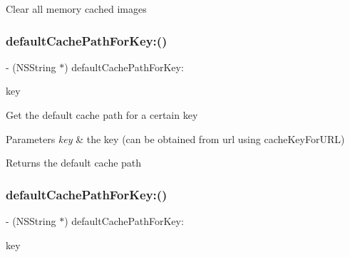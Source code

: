 Clear all memory cached images \mbox{\label{interface_s_d_image_cache_a591ff2cb8bcd813969b33c610c569bdc}} 
\subsubsection{\texorpdfstring{default\+Cache\+Path\+For\+Key\+:()}{defaultCachePathForKey:()}\hspace{0.1cm}{\footnotesize\ttfamily [1/3]}}
{\footnotesize\ttfamily -\/ (N\+S\+String $\ast$) default\+Cache\+Path\+For\+Key\+: \begin{DoxyParamCaption}\item[{(N\+S\+String $\ast$)}]{key }\end{DoxyParamCaption}}

Get the default cache path for a certain key


\begin{DoxyParams}{Parameters}
{\em key} & the key (can be obtained from url using cache\+Key\+For\+U\+RL)\\
\hline
\end{DoxyParams}
\begin{DoxyReturn}{Returns}
the default cache path 
\end{DoxyReturn}
\mbox{\label{interface_s_d_image_cache_a591ff2cb8bcd813969b33c610c569bdc}} 
\subsubsection{\texorpdfstring{default\+Cache\+Path\+For\+Key\+:()}{defaultCachePathForKey:()}\hspace{0.1cm}{\footnotesize\ttfamily [2/3]}}
{\footnotesize\ttfamily -\/ (N\+S\+String $\ast$) default\+Cache\+Path\+For\+Key\+: \begin{DoxyParamCaption}\item[{(N\+S\+String $\ast$)}]{key }\end{DoxyParamCaption}}

